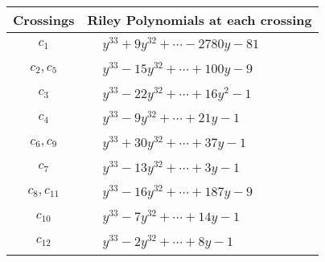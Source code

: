 \documentclass[1p]{elsarticle_modified}
\theoremstyle{definition}
\begin{document}
\begin{tabular}{m{50pt}|m{274pt}}
Crossings & \hspace{64pt}Riley Polynomials at each crossing \\
\hline $$\begin{aligned}c_{1}\end{aligned}$$&$\begin{aligned}
&y^{33}+9 y^{32}+\cdots-2780 y-81
\end{aligned}$\\
\hline $$\begin{aligned}c_{2},c_{5}\end{aligned}$$&$\begin{aligned}
&y^{33}-15 y^{32}+\cdots+100 y-9
\end{aligned}$\\
\hline $$\begin{aligned}c_{3}\end{aligned}$$&$\begin{aligned}
&y^{33}-22 y^{32}+\cdots+16 y^2-1
\end{aligned}$\\
\hline $$\begin{aligned}c_{4}\end{aligned}$$&$\begin{aligned}
&y^{33}-9 y^{32}+\cdots+21 y-1
\end{aligned}$\\
\hline $$\begin{aligned}c_{6},c_{9}\end{aligned}$$&$\begin{aligned}
&y^{33}+30 y^{32}+\cdots+37 y-1
\end{aligned}$\\
\hline $$\begin{aligned}c_{7}\end{aligned}$$&$\begin{aligned}
&y^{33}-13 y^{32}+\cdots+3 y-1
\end{aligned}$\\
\hline $$\begin{aligned}c_{8},c_{11}\end{aligned}$$&$\begin{aligned}
&y^{33}-16 y^{32}+\cdots+187 y-9
\end{aligned}$\\
\hline $$\begin{aligned}c_{10}\end{aligned}$$&$\begin{aligned}
&y^{33}-7 y^{32}+\cdots+14 y-1
\end{aligned}$\\
\hline $$\begin{aligned}c_{12}\end{aligned}$$&$\begin{aligned}
&y^{33}-2 y^{32}+\cdots+8 y-1
\end{aligned}$\\
\hline
\end{tabular}\\~\\
\end{document}
